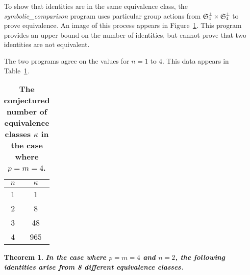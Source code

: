 \documentclass[12pt,table]{article}
\newtheorem{theorem}{Theorem}
\numberwithin{equation}{section}
\begin{document}
\begin{landscape}
{{\begin{figure}[h]
\label{figure_connections}
 
\end{figure}





To show that identities are in the same
equivalence class, the
\emph{symbolic\_comparison}
program
uses particular
group actions from 
$ \mathfrak{S}_4^\pm \times \mathfrak{S}_4^\pm $
to prove equivalence.
An image of this process
appears in 
Figure~\ref{figure_connections}.
This program provides an upper
bound on the number of identities,
but cannot prove that two identities
are not equivalent.

The two programs agree on the values for 
$n = 1$ to $4$. This data appears in 
Table~\ref{table:4D}.


\begin{table}[h]




\begin{center}


\begin{tabular}{ c | c }
 $ n $ & $ \kappa $ \\
\hline\hline
 1 & 1 \\
\hline
 2 & 8 \\
\hline
 3 & 48 \\
\hline
 4 & 965 
\end{tabular}





\end{center}
\caption{
\bf
The conjectured number of equivalence
classes $ \kappa $  
in the case where $p = m = 4$.
 }

\label{table:4D}

\end{table}

\newpage



\begin{theorem}
\label{theorem_8_classes}
\bf
In the case where  $p = m = 4$ and $n = 2$,
the following identities 
arise from 8 different
equivalence classes.


\end{theorem}}}
\end{landscape}
\end{document}
